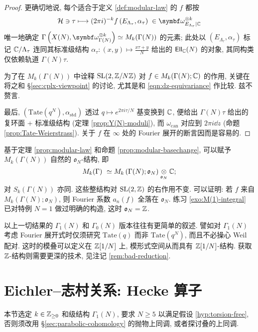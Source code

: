 \begin{proof}
	更确切地说, 每个适合于定义 \ref{def:modular-law} 的 $f$ 都按
	\[ \mathcal{H} \ni \tau \longmapsto (2\pi i)^{-k} f\left( E_{\Lambda_\tau}, \alpha_\tau \right) \; \in \bomega_{E_{\Lambda_\tau}|\CC}^{\otimes k} \]
	唯一地确定 $\Gamma\left(X(N), \bomega^{\otimes k}_{\Gamma(N)}\right) \simeq M_k(\Gamma(N))$ 的元素; 此处以 $(E_{\Lambda_\tau}, \alpha_\tau)$ 标记 $\mathbb{C}/\Lambda_\tau$ 连同其标准级结构 $\alpha_\tau: (x,y) \mapsto \frac{x\tau + y}{N}$ 给出的 $\mathsf{Ell}_{\mathbb{C}}(N)$ 的对象, 其同构类仅依赖轨道 $\Gamma(N)\tau$.

	为了在 $M_k(\Gamma(N))$ 中诠释 $\operatorname{SL}(2,\mathbb{Z}/N\mathbb{Z})$ 对 $f \in M_k(\Gamma(N); \mathbb{C})$ 的作用, 关键在将之和 \S\ref{sec:cplx-viewpoint} 的讨论, 尤其是和 \eqref{eqn:dz-equivariance} 作比较. 兹不赘言.
	
	最后, $\left( \mathrm{Tate}\left( q^N \right), \alpha_{\mathrm{std}} \right)$ 透过 $q \mapsto e^{2\pi i\tau/N}$ 基变换到 $\mathbb{C}$, 便给出 $\Gamma(N)\tau$ 给出的复环面 + 标准级结构 (定理 \ref{prop:Y(N)-moduli}), 而 $\omega_{\mathrm{can}}$ 对应到 $2\pi i \dd z$ (命题 \ref{prop:Tate-Weierstrass}). 关于 $f$ 在 $\infty$ 处的 Fourier 展开的断言因而是容易的.
\end{proof}

基于定理 \ref{prop:modular-law} 和命题 \ref{prop:modular-basechange}, 可以赋予 $M_k(\Gamma(N))$ 自然的 $\mathfrak{o}_N$-结构, 即
\[ M_k(\Gamma)\ \simeq M_k\left( \Gamma(N); \mathfrak{o}_N \right) \underset{\mathfrak{o}_N}{\otimes} \mathbb{C}; \]
对 $S_k(\Gamma(N))$ 亦同. 这些整结构对 $\operatorname{SL}(2,\mathbb{Z})$ 的右作用不变. 可以证明: 若 $f$ 来自 $M_k\left( \Gamma(N); \mathfrak{o}_N \right)$, 则 Fourier 系数 $a_n(f)$ 全落在 $\mathfrak{o}_N$. 练习 \ref{exo:M(1)-integral} 已对特例 $N = 1$ 做过明确的构造, 这时 $\mathfrak{o}_N = \mathbb{Z}$.

\begin{remark}\label{rem:rational-structure-Gamma1}
	以上一切结果的 $\Gamma_1(N)$ 和 $\Gamma_0(N)$ 版本往往有更简单的叙述. 譬如对 $\Gamma_1(N)$ 考虑 Fourier 展开式时仅须研究 $\mathrm{Tate}(q)$ 而非 $\mathrm{Tate}\left(q^N\right)$, 而且不必操心 Weil 配对. 这时的模叠可以定义在 $\mathbb{Z}[1/N]$ 上, 模形式空间从而具有 $\mathbb{Z}[1/N]$-结构. 获取 $\mathbb{Z}$-结构则需要更深的技术, 见注记 \ref{rem:bad-reduction}.
\end{remark}


\section{Eichler--志村关系: Hecke 算子}\label{sec:Eichler-Shimura-cong}
本节选定 $k \in \mathbb{Z}_{\geq 0}$ 和级结构 $\Gamma_1(N)$, 要求 $N \geq 5$ 以满足假设 \ref{hyp:torsion-free}, 否则须改用 \S\ref{sec:parabolic-cohomology} 的抛物上同调, 或者探讨叠的上同调.

